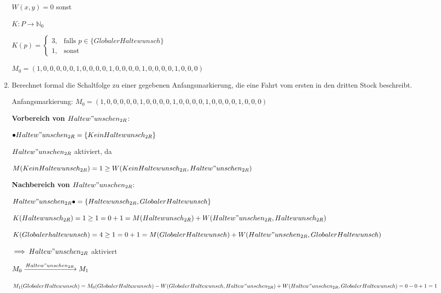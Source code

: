 \documentclass{scrreprt}
\begin{document}
\begin{enumerate}
$W(x,y) = 0$ sonst

$K : P \rightarrow \mathds{N}_0$

$
K(p) = 
  \begin{cases}
    3, & \text{falls $p \in \{ GlobalerHaltewunsch \}$} \\ 
    1, & \text{sonst} \end{cases}$

$M_0 = (
1, 0, 0, 0, 0, 
0, 1, 0, 0, 0, 
0, 1, 0, 0, 0, 
0, 1, 0, 0, 0, 
0, 1, 0, 0, 0
)$

\item Berechnet formal die Schaltfolge zu einer gegebenen Anfangsmarkierung, die eine Fahrt vom ersten in den dritten Stock beschreibt.


Anfangsmarkierung: 
$M_0 = (
1, 0, 0, 0, 0, 
0, 1, 0, 0, 0, 
0, 1, 0, 0, 0, 
0, 1, 0, 0, 0, 
0, 1, 0, 0, 0
)$


\textbf{Vorbereich von $Haltew"unschen_{2R}$}:

\begin{addmargin}[1cm]{0cm}
  $\bullet Haltew"unschen_{2R} = \{ KeinHaltewunsch_{2R} \}$

  $Haltew"unschen_{2R}$ aktiviert, da

  $M(KeinHaltewunsch_{2R}) = 1 \geq W(KeinHaltewunsch_{2R}, Haltew"unschen_{2R})$
\end{addmargin}

\textbf{Nachbereich von $Haltew"unschen_{2R}$}:

\begin{addmargin}[1cm]{0cm}
  $Haltew"unschen_{2R} \bullet = \{ Haltewunsch_{2R}, GlobalerHaltewunsch \}$

  $K(Haltewunsch_{2R}) = 1 \geq 1 = 0 + 1 = M(Haltewunsch_{2R}) + \\ W(Haltew"unschen_{2R}, Haltewunsch_{2R})$

  $K(Globalerhaltewunsch) = 4 \geq 1 = 0 + 1 = M(GlobalerHaltewunsch) + W(Haltew"unschen_{2R}, GlobalerHaltewunsch)$

  $\implies Haltew"unschen_{2R}$ aktiviert
\end{addmargin}


$M_0 \xrightarrow{Haltew"unschen_{2R}} M_1$

\begin{addmargin}[1cm]{0cm}
  $M_1(GlobalerHaltewunsch) = M_0(GlobalerHaltewunsch) - \\ W(GlobalerHaltewunsch, Haltew"unschen_{2R}) + \\ W(Haltew"unschen_{2R}, GlobalerHaltewunsch) = 0 - 0 + 1 = 1$


\end{addmargin}
\end{enumerate}
\end{document}

